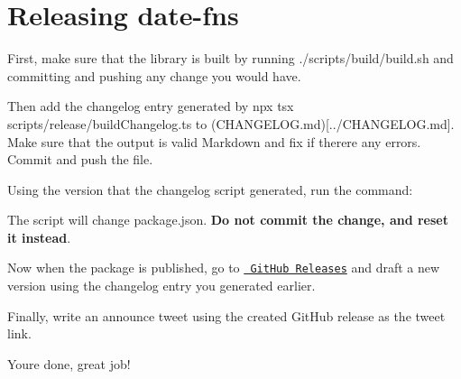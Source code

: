 \chapter{Releasing date-\/fns}
\hypertarget{md__2home_2solype_2delivery_2current__days_2trello_2front_2node__modules_2date-fns_2docs_2release}{}\label{md__2home_2solype_2delivery_2current__days_2trello_2front_2node__modules_2date-fns_2docs_2release}
\label{md__2home_2solype_2delivery_2current__days_2trello_2front_2node__modules_2date-fns_2docs_2release_autotoc_md9697}%
%

\begin{DoxyEnumerate}
\item First, make sure that the library is built by running {\ttfamily ./scripts/build/build.sh} and committing and pushing any change you would have.
\item Then add the changelog entry generated by {\ttfamily npx tsx scripts/release/build\+Changelog.\+ts} to (CHANGELOG.\+md)\mbox{[}../\+CHANGELOG.md\mbox{]}. Make sure that the output is valid Markdown and fix if there\textquotesingle{}re any errors. Commit and push the file.
\item Using the version that the changelog script generated, run the command\+:


\begin{DoxyCode}{0}

\end{DoxyCode}


The script will change {\ttfamily package.\+json}. {\bfseries{Do not commit the change, and reset it instead}}.
\item Now when the package is published, go to \href{https://github.com/date-fns/date-fns/releases}{\texttt{ Git\+Hub Releases}} and draft a new version using the changelog entry you generated earlier.
\item Finally, write an announce tweet using the created Git\+Hub release as the tweet link.
\end{DoxyEnumerate}

You\textquotesingle{}re done, great job! 